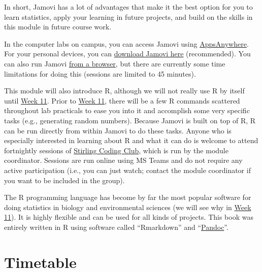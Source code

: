 \documentclass[
]{scrbook}
\begin{document}
In short, Jamovi has a lot of advantages that make it the best option for you to learn statistics, apply your learning in future projects, and build on the skills in this module in future course work.

In the computer labs on campus, you can access Jamovi using \href{https://appsanywhere.stir.ac.uk/}{AppsAnywhere}.
For your personal devices, you can \href{https://www.jamovi.org/download.html}{download Jamovi here} (recommended).
You can also run Jamovi \href{https://www.jamovi.org/cloud.html}{from a browser}, but there are currently some time limitations for doing this (sessions are limited to 45 minutes).

This module will also introduce R, although we will not really use R by itself until \protect\hyperlink{Week_11}{Week 11}.
Prior to \protect\hyperlink{Week_11}{Week 11}, there will be a few R commands scattered throughout lab practicals to ease you into it and accomplish some very specific tasks (e.g., generating random numbers).
Because Jamovi is built on top of R, R can be run directly from within Jamovi to do these tasks.
Anyone who is especially interested in learning about R and what it can do is welcome to attend fortnightly sessions of \href{https://stirlingcodingclub.github.io/studyGroup/}{Stirling Coding Club}, which is run by the module coordinator.
Sessions are run online using MS Teams and do not require any active participation (i.e., you can just watch; contact the module coordinator if you want to be included in the group).

The R programming language has become by far the most popular software for doing statistics in biology and environmental sciences (we will see why in \protect\hyperlink{Week_11}{Week 11}).
It is highly flexible and can be used for all kinds of projects.
This book was entirely written in R using software called ``Rmarkdown'' and ``\href{https://pandoc.org/}{Pandoc}''.

\hypertarget{timetable}{%
\section*{Timetable}\label{timetable}}
\end{document}
